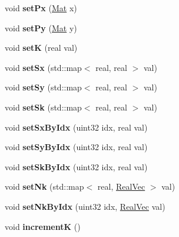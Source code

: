 \begin{DoxyCompactItemize}
void {\bfseries set\+Px} (\mbox{\hyperlink{aux_8h_aa1fe91b8cd36c618282eb0d548690c4c}{Mat}} x)
\item 
\mbox{\label{classvd_a8314de29eacf72f10afee2c67b0c9819}} 
void {\bfseries set\+Py} (\mbox{\hyperlink{aux_8h_aa1fe91b8cd36c618282eb0d548690c4c}{Mat}} y)
\item 
\mbox{\label{classvd_a7c692a97b49c4596c4ec1bc0a129b516}} 
void {\bfseries setK} (real val)
\item 
\mbox{\label{classvd_afb492f7d32ff2a4d54bd531d57d66a1a}} 
void {\bfseries set\+Sx} (std\+::map$<$ real, real $>$ val)
\item 
\mbox{\label{classvd_af103a45c726643e96f69be4363ad2409}} 
void {\bfseries set\+Sy} (std\+::map$<$ real, real $>$ val)
\item 
\mbox{\label{classvd_a42dc1ab4c7033c49c0b3716d461ad2ef}} 
void {\bfseries set\+Sk} (std\+::map$<$ real, real $>$ val)
\item 
\mbox{\label{classvd_a440d47d94f489ceefa9037be51daef66}} 
void {\bfseries set\+Sx\+By\+Idx} (uint32 idx, real val)
\item 
\mbox{\label{classvd_a5407f9c20ed4ff2300ccbebb999d1dde}} 
void {\bfseries set\+Sy\+By\+Idx} (uint32 idx, real val)
\item 
\mbox{\label{classvd_a578ca6980896563397214c584401c7f5}} 
void {\bfseries set\+Sk\+By\+Idx} (uint32 idx, real val)
\item 
\mbox{\label{classvd_aa1a3d9448f6ff6f8076b15c9e9a63d7e}} 
void {\bfseries set\+Nk} (std\+::map$<$ real, \mbox{\hyperlink{aux_8h_ac0a1a538b45426e056715d1f59f854ab}{Real\+Vec}} $>$ val)
\item 
\mbox{\label{classvd_aa45da38425cbd5b48f61313323ba6204}} 
void {\bfseries set\+Nk\+By\+Idx} (uint32 idx, \mbox{\hyperlink{aux_8h_ac0a1a538b45426e056715d1f59f854ab}{Real\+Vec}} val)
\item 
\mbox{\label{classvd_a59c1f5756af7de9cc7a0089221cbd5b7}} 
void {\bfseries incrementK} ()

\end{DoxyCompactItemize}
